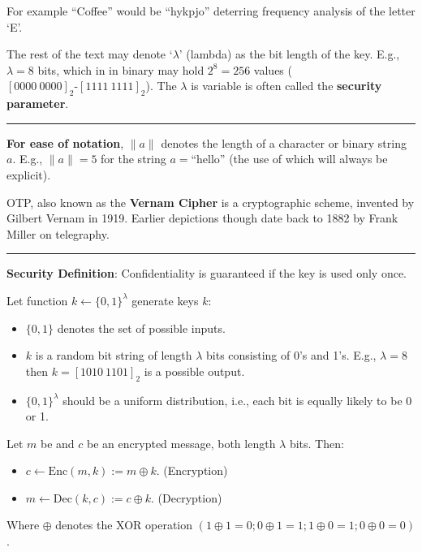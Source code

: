 \noindent
For example ``Coffee'' would be ``hykpjo'' deterring frequency analysis of the letter `E'.

\newpage 

\begin{Func}

    \vspace{-.5em}
    \label{func:bit_length}
    The rest of the text may denote `$\lambda$' (lambda) as the bit length of the key. E.g., $\lambda = 8$ bits, which in in binary may hold $2^8 = 256$ values ($[0000\ 0000]_2\text{-}[1111\ 1111]_2$).
    The $\lambda$ is variable is often called the \textbf{security parameter}.\\
    \noindent
    \rule{\textwidth}{0.4pt}
    \textbf{For ease of notation}, $\|a\|$ denotes the length of a character or binary string $a$. E.g., $\|a\| = 5$ for the string $a = \text{``hello''}$
    (the use of which will always be explicit).
    \hfill \cite{joyofcryptography}
\end{Func}

\begin{Def}

    \label{def:one_time_pad}
    OTP, also known as the \textbf{Vernam Cipher} is a cryptographic scheme, invented by Gilbert Vernam in 1919.
    Earlier depictions though date back to 1882 by Frank Miller on telegraphy.\\
    \noindent
    \rule{\textwidth}{0.4pt}
    \textbf{Security Definition}: Confidentiality is guaranteed if the key is used only once.
\end{Def}

\begin{Func}

    \vspace{-.5em}
    \label{func:otp}
    \noindent
    Let function $k\leftarrow\{0,1\}^{\lambda}$ generate keys $k$:
    \begin{itemize}
        \item $\{0,1\}$ denotes the set of possible inputs.
        \item $k$ is a random bit string of length $\lambda$ bits consisting of 0's and 1's. E.g., $\lambda = 8$ then $k = [1010\ 1101]_2$ is a possible output.
        \item $\{0,1\}^{\lambda}$ should be a uniform distribution, i.e., each bit is equally likely to be 0 or 1.
    \end{itemize}
    \noindent
    Let $m$ be and $c$ be an encrypted message, both length $\lambda$ bits. Then: 
    \begin{itemize}
        \item $c\leftarrow \text{Enc}(m,k) := m\oplus k$. (Encryption)
        \item $m\leftarrow \text{Dec}(k,c) := c\oplus k$. (Decryption)
    \end{itemize}

    \noindent
    Where $\oplus$ denotes the XOR operation $(1\oplus1=0; 0\oplus1=1; 1\oplus0=1; 0\oplus0=0)$.
\end{Func}

